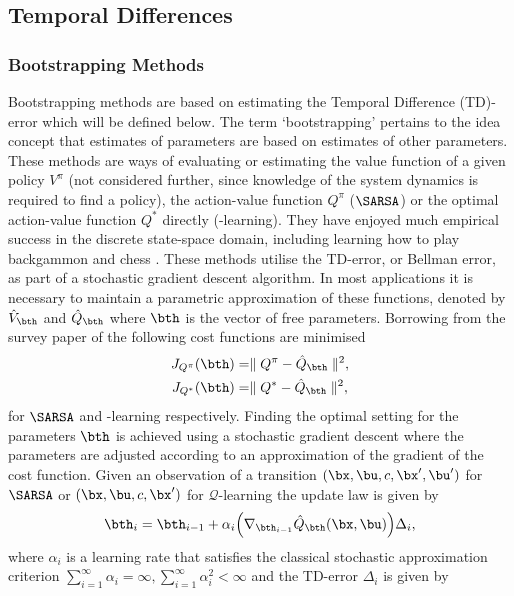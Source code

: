 \subsection{Temporal Differences}
\subsubsection{Bootstrapping Methods}
Bootstrapping methods are based on estimating the Temporal Difference (TD)-error which will be defined below. The term `bootstrapping' pertains to the idea concept that estimates of parameters are based on estimates of other parameters. These methods are ways of evaluating or estimating the value function of a given policy $V^\pi$ (not considered further, since knowledge of the system dynamics is required to find a policy), the action-value function $Q^\pi$ ($\SARSA$) or the optimal action-value function $Q^*$ directly (\Q-learning). They have enjoyed much empirical success in the discrete state-space domain, including learning how to play backgammon \cite{Tes92,Tes95} and chess \cite{BTW00}. These methods utilise the TD-error, or Bellman error, as part of a stochastic gradient descent algorithm. In most applications it is necessary to maintain a parametric approximation of these functions, denoted by $\hat V_{\bth}$ and $\hat Q_{\bth}$ where $\bth$ is the vector of free parameters. Borrowing from the survey paper of \cite{GP10b} the following cost functions are minimised
\begin{align}
J_{Q^{\pi}}(\bth) &= \parallel Q^\pi - \hat Q_{\bth} \parallel^2, \label{eqn:JQcost1} \\
J_{Q^*}(\bth) &= \parallel Q^* - \hat Q_{\bth} \parallel^2 , \label{eqn:JQcost2}
\end{align}
for $\SARSA$ and \Q-learning respectively. Finding the optimal setting for the parameters $\bth$ is achieved using a stochastic gradient descent where the parameters are adjusted according to an approximation of the gradient of the cost function. Given an observation of a transition $(\bx,\bu,c,\bx',\bu')$ for $\SARSA$ or $(\bx,\bu,c,\bx')$ for $\mathcal{Q}$-learning the update law is given by
\begin{equation}
\bth_i = \bth_{i-1} + \alpha_i \Big( \nabla_{\bth_{i-1}}\hat Q_{\bth}(\bx,\bu) \Big) \Delta_{i} ,
\end{equation}
where $\alpha_i$ is a learning rate that satisfies the classical stochastic approximation criterion $\sum^\infty_{i=1} \alpha_i = \infty, \sum^\infty_{i=1} \alpha_i^2 < \infty$ and the TD-error $\Delta_{i}$ is given by
